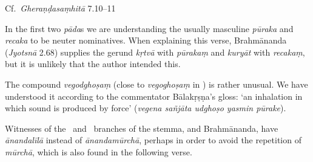 \begin{ekdosis}
\begin{testimonia}[hp02_069]
Cf.~\emph{Gheraṇḍasaṃhitā} 7.10--11

\begin{versinnote}
\end{versinnote}
\end{testimonia}

\begin{philcomm}[hp02_069]
In the first two \emph{pāda}s we are understanding the usually masculine \emph{pūraka} and \emph{recaka} to be neuter nominatives. When explaining this verse, Brahmānanda (\emph{Jyotsnā} 2.68) supplies the gerund \emph{kṛtvā} with \emph{pūrakaṃ} and \emph{kuryāt} with \emph{recakaṃ}, but it is unlikely that the author intended this. 

The compound \emph{vegodghoṣaṃ} (close to \emph{vegoghoṣaṃ} in \alphaOne) is rather unusual. We have understood it according to the commentator Bālakṛṣṇa’s gloss: `an inhalation in which sound is produced by force' (\emph{vegena sañjāta udghoṣo yasmin pūrake}).

Witnesses of the \gamma \ and \delta \ branches of the stemma, and Brahmānanda, have \emph{ānandalīlā} instead of \emph{ānandamūrchā}, perhaps in order to avoid the repetition of \emph{mūrchā}, which is also found in the following verse.

\end{philcomm}


\end{ekdosis}
